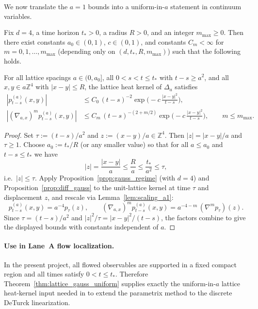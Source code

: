 We now translate the $a=1$ bounds into a uniform-in-$a$ statement in continuum variables.

\begin{theorem}\label{thm:lattice_gauss_uniform}
Fix $d=4$, a time horizon $t_\ast>0$, a radius $R>0$, and an integer $m_{\max}\ge 0$.
Then there exist constants $a_0\in(0,1)$, $c\in(0,1)$, and constants $C_m<\infty$ for $m=0,1,\dots,m_{\max}$
(depending only on $(d,t_\ast,R,m_{\max})$) such that the following holds.

For all lattice spacings $a\in(0,a_0]$, all $0<s<t\le t_\ast$ with $t-s\ge a^2$, and all $x,y\in a\mathbb Z^4$ with $|x-y|\le R$,
the lattice heat kernel of $\Delta_a$ satisfies
\begin{align}
|p_{t-s}^{(a)}(x,y)|
&\le
C_0\,(t-s)^{-2}\exp\!\Big(-c\,\frac{|x-y|^2}{t-s}\Big),\\
|(\nabla_{a,x})^m p_{t-s}^{(a)}(x,y)|
&\le
C_m\,(t-s)^{-(2+m/2)}\exp\!\Big(-c\,\frac{|x-y|^2}{t-s}\Big),
\qquad m\le m_{\max}.
\end{align}
\end{theorem}

\begin{proof}
Set $\tau:=(t-s)/a^2$ and $z:=(x-y)/a\in\mathbb Z^4$.
Then $|z|=|x-y|/a$ and $\tau\ge 1$.
Choose $a_0:=t_\ast/R$ (or any smaller value) so that for all $a\le a_0$ and $t-s\le t_\ast$ we have
\[
|z|=\frac{|x-y|}{a}\le \frac{R}{a}\le \frac{t_\ast}{a^2}\le \tau,
\]
i.e.\ $|z|\le \tau$.
Apply Proposition~\ref{prop:gauss_regime} (with $d=4$) and Proposition~\ref{prop:diff_gauss} to the unit-lattice kernel at time $\tau$ and displacement $z$,
and rescale via Lemma~\ref{lem:scaling_a1}:
\[
p_{t-s}^{(a)}(x,y)=a^{-4}p_{\tau}(z),
\qquad
(\nabla_{a,x})^m p_{t-s}^{(a)}(x,y)=a^{-4-m}\,(\nabla^m p_{\tau})(z).
\]
Since $\tau=(t-s)/a^2$ and $|z|^2/\tau=|x-y|^2/(t-s)$, the factors combine to give the displayed bounds with constants independent of $a$.
\end{proof}

\paragraph{Use in Lane~A flow localization.}
In the present project, all flowed observables are supported in a fixed compact region and all times satisfy $0<t\le t_\ast$.
Therefore Theorem~\ref{thm:lattice_gauss_uniform} supplies exactly the uniform-in-$a$ lattice heat-kernel input needed in to extend the parametrix method
to the discrete DeTurck linearization.